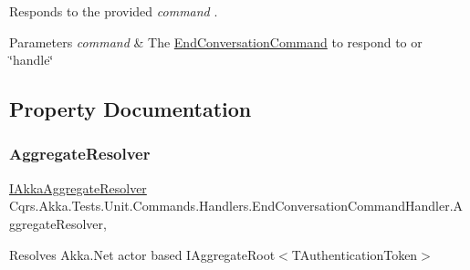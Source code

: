 Responds to the provided {\itshape command} . 


\begin{DoxyParams}{Parameters}
{\em command} & The \hyperlink{classCqrs_1_1Akka_1_1Tests_1_1Unit_1_1Commands_1_1EndConversationCommand}{End\+Conversation\+Command} to respond to or \char`\"{}handle\char`\"{}\\
\hline
\end{DoxyParams}


\subsection{Property Documentation}
\mbox{\label{classCqrs_1_1Akka_1_1Tests_1_1Unit_1_1Commands_1_1Handlers_1_1EndConversationCommandHandler_a39a99dda0cbadd3405a4a991fd3f2163_a39a99dda0cbadd3405a4a991fd3f2163}} 
\subsubsection{\texorpdfstring{Aggregate\+Resolver}{AggregateResolver}}
{\footnotesize\ttfamily \hyperlink{interfaceCqrs_1_1Akka_1_1Domain_1_1IAkkaAggregateResolver}{I\+Akka\+Aggregate\+Resolver} Cqrs.\+Akka.\+Tests.\+Unit.\+Commands.\+Handlers.\+End\+Conversation\+Command\+Handler.\+Aggregate\+Resolver\hspace{0.3cm}{\ttfamily [get]}, {\ttfamily [protected]}}



Resolves Akka.\+Net actor based I\+Aggregate\+Root$<$\+T\+Authentication\+Token$>$ 

